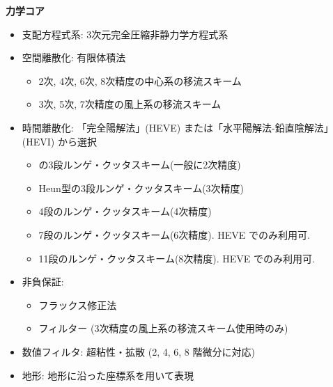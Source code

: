 {\bf 力学コア}
\begin{itemize}
 \item 支配方程式系: 3次元完全圧縮非静力学方程式系
 \item 空間離散化: 有限体積法
    \begin{itemize}
      \item 2次, 4次, 6次, 8次精度の中心系の移流スキーム
      \item 3次, 5次, 7次精度の風上系の移流スキーム
    \end{itemize}
 \item 時間離散化: 「完全陽解法」(HEVE) または「水平陽解法-鉛直陰解法」(HEVI) から選択
    \begin{itemize}
      \item \citet{Wicker_2002}の3段ルンゲ・クッタスキーム(一般に2次精度)
      \item Heun型の3段ルンゲ・クッタスキーム(3次精度)
      \item 4段のルンゲ・クッタスキーム(4次精度)
      \item 7段のルンゲ・クッタスキーム(6次精度). HEVE でのみ利用可. 
      \item 11段のルンゲ・クッタスキーム(8次精度). HEVE でのみ利用可. 
    \end{itemize}
 \item 非負保証:
    \begin{itemize}
      \item フラックス修正法 \citep[Flux Corrected Transport, FCT; ][]{zalesak_1979}
      \item \citet{Koren_1993}フィルター  (3次精度の風上系の移流スキーム使用時のみ)
    \end{itemize}
 \item 数値フィルタ: 超粘性・拡散 (2, 4, 6, 8 階微分に対応)
 \item 地形: 地形に沿った座標系を用いて表現
\end{itemize}

